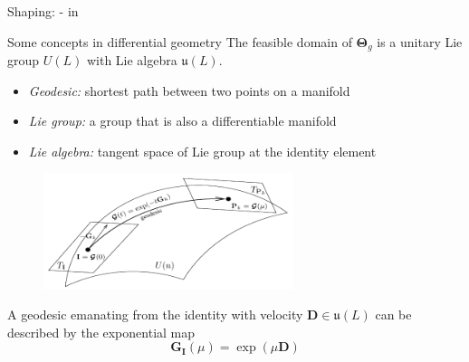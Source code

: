 \documentclass[presentation,xcolor={table},9pt]{beamer}
\begin{document}
\begin{section}{Shaping: - in }
	\begin{frame}{Some concepts in differential geometry}
		The feasible domain of $\mathbf{\Theta}_g$ is a unitary Lie group $U(L)$ with Lie algebra $\mathfrak{u}(L)$.
		\vspace{0.25em}
		\begin{itemize}
			\item \emph{Geodesic:} shortest path between two points on a manifold
			\item \emph{Lie group:} a group that is also a differentiable manifold
			\item \emph{Lie algebra:} tangent space of Lie group at the identity element
		\end{itemize}
		\begin{figure}
			\centering
			\includegraphics[width=0.65\textwidth]{../assets/viva/lie_group.pdf}
		\end{figure}
		A geodesic emanating from the identity with velocity $\mathbf{D} \in \mathfrak{u}(L)$ can be described by the exponential map
		\begin{equation*}
			\mathbf{G}_\mathbf{I}(\mu) = \exp(\mu \mathbf{D})
			\label{eq:geodesic_identity}
		\end{equation*}

	\end{frame}


\end{section}
\end{document}
